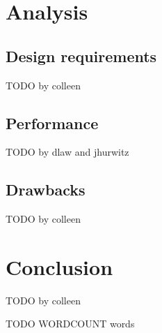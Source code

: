 \documentclass[11pt,titlepage]{article}
\begin{document}
\section{Analysis}

\subsection{Design requirements}

TODO by colleen

\subsection{Performance}

TODO by dlaw and jhurwitz

\subsection{Drawbacks}

TODO by colleen

\section{Conclusion}

TODO by colleen

 

TODO WORDCOUNT words
\end{document}
